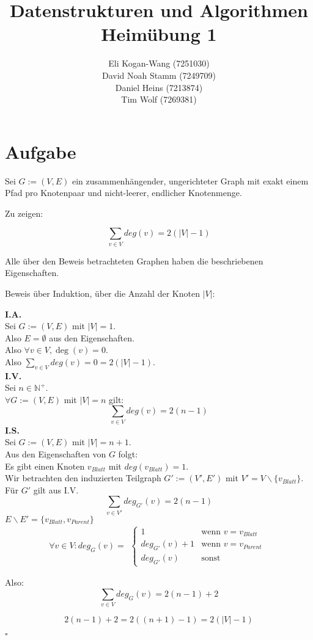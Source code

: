 \documentclass{article}
\newcommand{\zettelNummer}{1}
\newcommand{\studierenderEins}{Eli Kogan-Wang (7251030)}
\newcommand{\studierenderZwei}{David Noah Stamm (7249709)}
\newcommand{\studierenderDrei}{Daniel Heins (7213874)}
\newcommand{\studierenderVier}{Tim Wolf (7269381)}
\newcounter{AufgabenCounter}
\newcounter{TeilaufgabenCounter}
\newenvironment{aufgabe}{\section*{Aufgabe \theAufgabenCounter}\setcounter{TeilaufgabenCounter}{1}}{\stepcounter{AufgabenCounter}}
\newcommand{\qed}{\hfill$\square$}
\begin{document}
\title{Datenstrukturen und Algorithmen \\ Heimübung \zettelNummer{}}
\author{\studierenderEins{} \\
  \studierenderZwei{} \\
  \studierenderDrei{} \\
  \studierenderVier{}}

\maketitle

\begin{aufgabe}

  Sei $G := (V, E)$ ein zusammenhängender, ungerichteter Graph
  mit exakt einem Pfad pro Knotenpaar
  und nicht-leerer, endlicher Knotenmenge.

  Zu zeigen:

  $$\sum_{v\in V}deg(v)=2(|V|-1)$$

  Alle über den Beweis betrachteten Graphen haben die beschriebenen Eigenschaften.

  Beweis über Induktion, über die Anzahl der Knoten $|V|$:

  \textbf{I.A.}\\
  Sei $G := (V, E)$ mit $|V|=1$.\\
  Also $E=\emptyset$ aus den Eigenschaften.\\
  Also $\forall v\in V,\deg(v)=0$.\\
  Also $\sum_{v\in V}deg(v)=0=2(|V|-1)$.\\
  \textbf{I.V.}\\
  Sei $n\in \mathbb{N}^+$.\\
  $\forall G := (V, E)$ mit $|V|=n$ gilt:
  $$\sum_{v\in V}deg(v)=2(n-1)$$
  \textbf{I.S.}\\
  Sei $G := (V, E)$ mit $|V|=n+1$.\\
  Aus den Eigenschaften von $G$ folgt:\\
  Es gibt einen Knoten $v_{Blatt}$ mit $deg(v_{Blatt})=1$.\\
  Wir betrachten den induzierten Teilgraph $G' := (V', E')$ mit $V'=V\backslash\{v_{Blatt}\}$.\\
  Für $G'$ gilt aus I.V.
  $$\sum_{v\in V'}deg_{G'}(v)=2(n-1)$$
  $E\backslash E'=\{v_{Blatt},v_{Parent}\}$
  $$\forall v\in V: deg_G(v)=\begin{aligned}\begin{cases}
        1             & \text{wenn }v=v_{Blatt}  \\
        deg_{G'}(v)+1 & \text{wenn }v=v_{Parent} \\
        deg_{G'}(v)   & \text{sonst}
      \end{cases}\end{aligned}$$

  Also:
  $$\sum_{v\in V}deg_{G}(v)=2(n-1)+2$$

  $$2(n-1)+2=2((n+1)-1)=2(|V|-1)$$

  \qed

\end{aufgabe}
\end{document}
